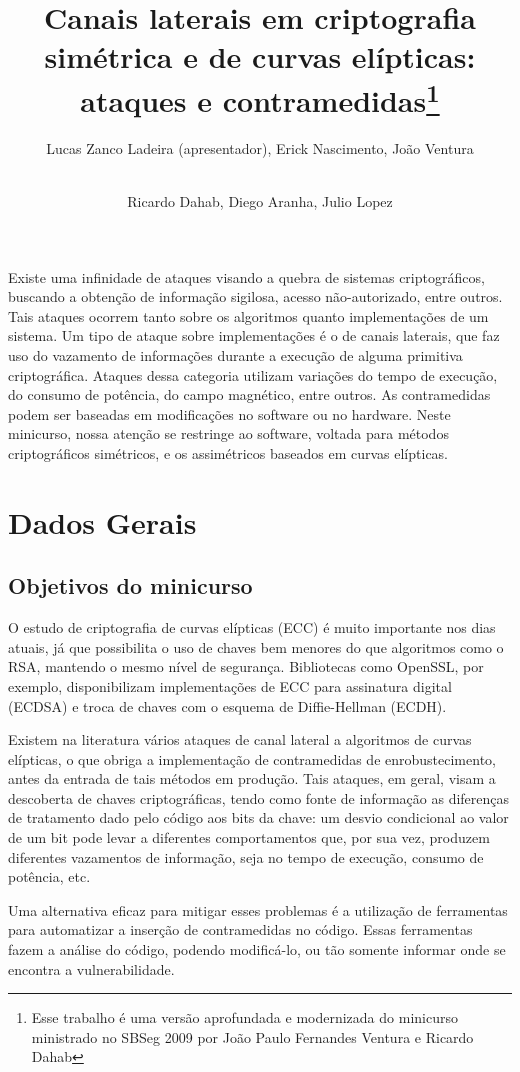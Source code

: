 \documentclass[12pt]{article}
\title{Canais laterais em criptografia simétrica e de curvas elípticas: ataques e contramedidas\footnote{Esse trabalho é uma versão aprofundada e modernizada do minicurso ministrado no SBSeg 2009 por João Paulo Fernandes Ventura e Ricardo Dahab}}
\author{Lucas Zanco Ladeira\inst{1} (apresentador), Erick Nascimento\inst{1}, Jo\~ao Ventura\inst{1}\and \\ Ricardo Dahab\inst{1}, Diego Aranha\inst{1}, Julio Lopez\inst{1}}
\begin{document}
 

\maketitle
     
\begin{resumo} 
Existe uma infinidade de ataques visando a quebra de sistemas criptogr\'aficos, buscando a obtenção de informação sigilosa, acesso não-autorizado, entre outros. Tais ataques ocorrem tanto sobre os algoritmos quanto implementações de um sistema. Um tipo de ataque sobre implementações \'e o de canais laterais, que faz uso do vazamento de informa\c{c}\~oes durante a execu\c{c}\~ao de alguma primitiva criptogr\'afica. Ataques dessa categoria utilizam variações do tempo de execução, do consumo de pot\^encia, do campo magn\'etico, entre outros. As contramedidas podem ser baseadas em modificações no software ou no hardware. Neste minicurso, nossa atenção se restringe ao software, voltada para métodos criptográficos simétricos, e os assimétricos baseados em curvas elípticas.
\end{resumo}

\section{Dados Gerais}
\subsection{Objetivos do minicurso}
O estudo de criptografia de curvas el\'ipticas (ECC) \'e muito importante nos dias atuais, já que possibilita o uso de chaves bem menores do que algoritmos como o RSA, mantendo o mesmo n\'ivel de segurança. Bibliotecas como OpenSSL, por exemplo, disponibilizam implementações de ECC para  assinatura digital (ECDSA) e troca de chaves com o esquema de Diffie-Hellman (ECDH).

Existem na literatura vários ataques de canal lateral a algoritmos de curvas el\'ipticas, o que obriga a implementa\c{c}\~ao de contramedidas de enrobustecimento, antes da entrada de tais métodos em produção. Tais ataques, em geral, visam a descoberta de chaves criptográficas, tendo como fonte de informação as diferenças de tratamento dado pelo código aos bits da chave: um desvio condicional ao valor de um bit pode levar a diferentes comportamentos que, por sua vez, produzem diferentes vazamentos de informação, seja no tempo de execução, consumo de potência, etc. 

Uma alternativa eficaz para mitigar esses problemas \'e a utiliza\c{c}\~ao de ferramentas para automatizar a inser\c{c}\~ao de contramedidas no c\'odigo. Essas ferramentas fazem a an\'alise do c\'odigo, podendo modificá-lo, ou tão somente informar onde se encontra a vulnerabilidade.
\end{document}
